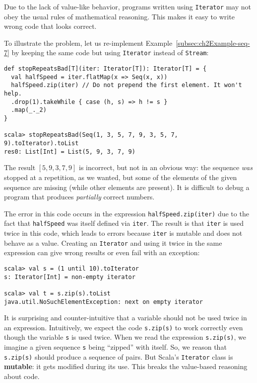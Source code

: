 Due to the lack of value-like behavior, programs written using \lstinline!Iterator!
may not obey the usual rules of mathematical reasoning. This
makes it easy to write wrong code that looks correct.

To illustrate the problem, let us re-implement Example~\ref{subsec:ch2Example-seq-7}
by keeping the same code but using \lstinline!Iterator! instead of
\lstinline!Stream!:
\begin{lstlisting}
def stopRepeatsBad[T](iter: Iterator[T]): Iterator[T] = {
  val halfSpeed = iter.flatMap(x => Seq(x, x))
  halfSpeed.zip(iter) // Do not prepend the first element. It won't help.
  .drop(1).takeWhile { case (h, s) => h != s }
  .map(_._2)
}

scala> stopRepeatsBad(Seq(1, 3, 5, 7, 9, 3, 5, 7, 9).toIterator).toList
res0: List[Int] = List(5, 9, 3, 7, 9)
\end{lstlisting}
The result $\left[5,9,3,7,9\right]$ is incorrect, but not in an obvious
way: the sequence \emph{was} stopped at a repetition, as we wanted,
but some of the elements of the given sequence are missing (while
other elements are present). It is difficult to debug a program that
produces \emph{partially} correct numbers.

The error in this code occurs in the expression \lstinline!halfSpeed.zip(iter)!
due to the fact that \lstinline!halfSpeed! was itself defined via
\lstinline!iter!. The result is that \lstinline!iter! is used twice
in this code, which leads to errors because \lstinline!iter! is mutable
and does not behave as a value. Creating an \lstinline!Iterator!
and using it twice in the same expression can give wrong results or
even fail with an exception:
\begin{lstlisting}
scala> val s = (1 until 10).toIterator
s: Iterator[Int] = non-empty iterator

scala> val t = s.zip(s).toList
java.util.NoSuchElementException: next on empty iterator
\end{lstlisting}
It is surprising and counter-intuitive that a variable should not
be used twice in an expression. Intuitively, we expect the code \lstinline!s.zip(s)!
to work correctly even though the variable \lstinline!s! is used
twice. When we read the expression \lstinline!s.zip(s)!, we imagine
a given sequence \lstinline!s! being \textsf{``}zipped\textsf{''} with itself. So,
we reason that \lstinline!s.zip(s)! should produce a sequence of
pairs. But Scala\textsf{'}s \lstinline!Iterator! class is \textbf{mutable}:
it gets modified during its use. This breaks the value-based reasoning
about code.

